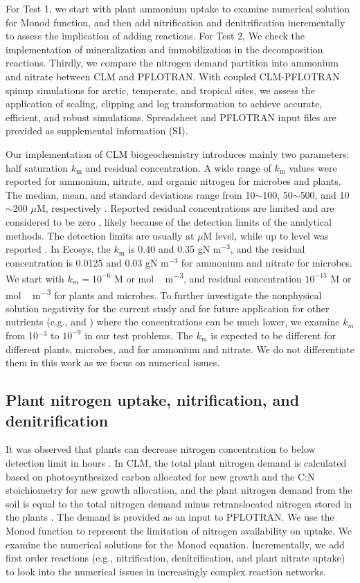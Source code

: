 \documentclass[gmd, manuscript]{copernicus}
\begin{document}
For Test 1, we start with plant ammonium uptake to examine numerical solution for Monod function, and then add nitrification and denitrification incrementally to assess the implication of adding reactions. For Test 2, We check the implementation of mineralization and immobilization in the decomposition reactions. Thirdly, we compare the nitrogen demand partition into ammonium and nitrate between CLM and PFLOTRAN. With coupled CLM-PFLOTRAN spinup simulations for arctic, temperate, and tropical sites, we assess the application of scaling, clipping and log transformation to achieve accurate, efficient, and robust simulations. Spreadsheet and PFLOTRAN input files are provided as supplemental information (SI).

Our implementation of CLM biogeochemistry introduces mainly two parameters: half saturation $k_\text{m}$ and residual concentration. A wide range of $k_\text{m}$ values were reported for ammonium, nitrate, and organic nitrogen for microbes and plants. The median, mean, and standard deviations range from 10$\sim$100, 50$\sim$500, and 10$\sim$200 $\mu$M, respectively
\citep{Kuzyakov2013}. Reported residual concentrations are limited and are considered to be zero \cite[e.g.,][]{Hogh1997}, likely because of the detection limits of the analytical methods. The detection limits are usually at
$\mu$M level, while up to  level was reported \citep{Nollet2013}. In Ecosys,
the $k_\text{m}$ is 0.40 and 0.35 gN m$^{-3}$, and the residual concentration
is 0.0125 and 0.03 gN m$^{-3}$ \citep{Grant2013} for ammonium and
nitrate for microbes.  
We start with $k_m=10^{-6}$ \unit{M} or \unit{mol\,m^{-3}},
and residual concentration $10^{-15}$ \unit{M} or \unit{mol\, m^{-3}} for
plants and microbes. To further investigate the nonphysical solution negativity for the
current study and for future application for other nutrients (e.g., 
and ) where the concentrations can be much lower, we examine $k_m$
from 10$^{-3}$ to $10^{-9}$ in our test problems. The $k_\text{m}$ is expected
to be different for different plants, microbes, and for ammonium and
nitrate. We do not differentiate them in this work as we focus on
numerical issues. 

\subsection{Plant nitrogen uptake, nitrification, and denitrification}
\label{sec:test1}
It was observed that plants can decrease nitrogen concentration to below
detection limit in hours \citep{Kamer2001}. 
In CLM, the total plant nitrogen demand is
calculated based on photosynthesized carbon allocated for new growth and the
C:N stoichiometry for new growth allocation, and the plant nitrogen demand from
the soil is equal to the total nitrogen demand minus retranslocated nitrogen
stored in the plants  \citep{Oleson2013}. The demand is provided
as an input to PFLOTRAN. We use the
Monod function to represent the limitation of nitrogen availability on uptake.
We examine the numerical solutions for the Monod equation. Incrementally, we
add first order reactions (e.g., nitrification, denitrification, and plant
nitrate uptake) to look into the numerical issues in increasingly complex reaction networks. 
\end{document}
